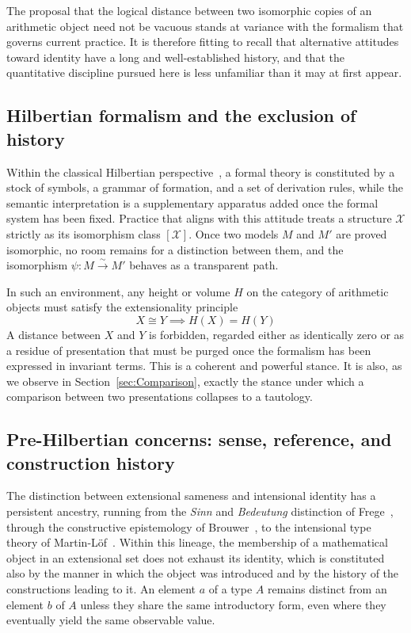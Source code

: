 \documentclass[10pt, reqno]{amsart}
\theoremstyle{plain}
\theoremstyle{definition}
\theoremstyle{plain}
\begin{document}
The proposal that the logical distance between two isomorphic copies of an arithmetic object need not be vacuous stands at variance with the formalism that governs current practice. It is therefore fitting to recall that alternative attitudes toward identity have a long and well-established history, and that the quantitative discipline pursued here is less unfamiliar than it may at first appear.

\subsection{Hilbertian formalism and the exclusion of history}

Within the classical Hilbertian perspective~\cite{vonHeijenoort1967Hilbert}, a formal theory is constituted by a stock of symbols, a grammar of formation, and a set of derivation rules, while the semantic interpretation is a supplementary apparatus added once the formal system has been fixed. Practice that aligns with this attitude treats a structure $\mathcal{X}$ strictly as its isomorphism class $[\mathcal{X}]$. Once two models $M$ and $M'$ are proved isomorphic, no room remains for a distinction between them, and the isomorphism $\psi \colon M \xrightarrow{\sim} M'$ behaves as a transparent path.

In such an environment, any height or volume $H$ on the category of arithmetic objects must satisfy the extensionality principle
\[
  X \cong Y \implies H(X) = H(Y)
\]
A distance between $X$ and $Y$ is forbidden, regarded either as identically zero or as a residue of presentation that must be purged once the formalism has been expressed in invariant terms. This is a coherent and powerful stance. It is also, as we observe in Section~\ref{sec:Comparison}, exactly the stance under which a comparison between two presentations collapses to a tautology.

\subsection{Pre-Hilbertian concerns: sense, reference, and construction history}
\label{subsec:PreHilbert}

The distinction between extensional sameness and intensional identity has a persistent ancestry, running from the \textit{Sinn} and \textit{Bedeutung} distinction of Frege~\cite{Frege1892}, through the constructive epistemology of Brouwer~\cite{Brouwer1908}, to the intensional type theory of Martin-L\"of~\cite{MartinLof1975}. Within this lineage, the membership of a mathematical object in an extensional set does not exhaust its identity, which is constituted also by the manner in which the object was introduced and by the history of the constructions leading to it. An element $a$ of a type $A$ remains distinct from an element $b$ of $A$ unless they share the same introductory form, even where they eventually yield the same observable value.
\end{document}
